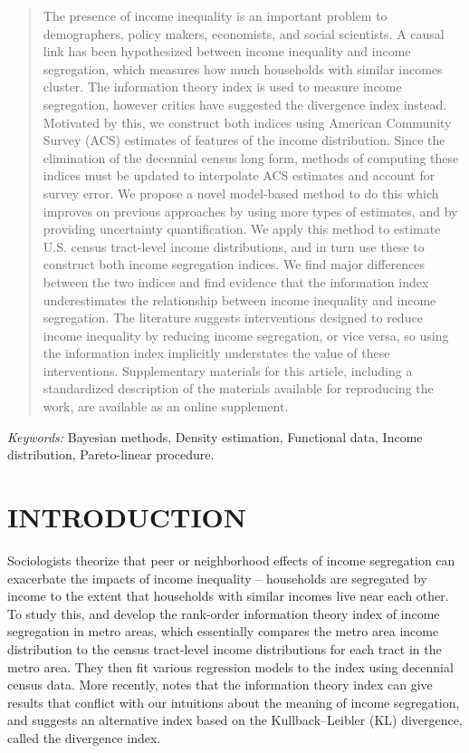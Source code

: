 \documentclass[12pt]{article}
\begin{document}
\newpage
\begin{abstract}
The presence of income inequality is an important problem to demographers, policy makers, economists, and social scientists. A causal link has been hypothesized between income inequality and income segregation, which measures how much households with similar incomes cluster. The information theory index is used to measure income segregation, however critics have suggested the divergence index instead. Motivated by this, we construct both indices using American Community Survey (ACS) estimates of features of the income distribution. Since the elimination of the decennial census long form, methods of computing these indices must be updated to interpolate ACS estimates and account for survey error. We propose a novel model-based method to do this which improves on previous approaches by using more types of estimates, and by providing uncertainty quantification. We apply this method to estimate U.S. census tract-level income distributions, and in turn use these to construct both income segregation indices. We find major differences between the two indices and find evidence that the information index underestimates the relationship between income inequality and income segregation. The literature suggests interventions designed to reduce income inequality by reducing income segregation, or vice versa, so using the information index implicitly understates the value of these interventions. Supplementary materials for this article, including a standardized description of the materials available for reproducing the work, are available as an online supplement.
\end{abstract}

\noindent%
{\it Keywords:}  Bayesian methods, Density estimation, Functional data, Income distribution, Pareto-linear procedure. 
\vfill

\newpage
{} %

\section{INTRODUCTION}\label{sec:intro}
Sociologists theorize that peer or neighborhood effects of income segregation can exacerbate the impacts of income inequality \citep[][and references therein]{reardon2011income} -- households are segregated by income to the extent that households with similar incomes live near each other. To study this, \citet{reardon2011measures} and \citet{reardon2011income} develop the rank-order information theory index of income segregation in metro areas, which essentially compares the metro area income distribution to the census tract-level income distributions for each tract in the metro area. They then fit various regression models to the index using decennial census data. More recently, \citet{roberto2015divergence} notes that the information theory index can give results that conflict with our intuitions about the meaning of income segregation, and suggests an alternative index based on the Kullback–Leibler (KL) divergence, called the divergence index.
\end{document}

